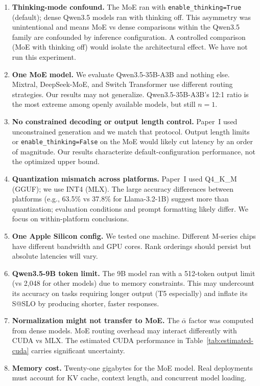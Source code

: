 \documentclass[11pt]{article}
\begin{document}
\begin{enumerate}[leftmargin=12pt]
    \item \textbf{Thinking-mode confound.} The MoE ran with \texttt{enable\_thinking=True} (default); dense Qwen3.5 models ran with thinking off.  This asymmetry was unintentional and means MoE vs dense comparisons within the Qwen3.5 family are confounded by inference configuration.  A controlled comparison (MoE with thinking off) would isolate the architectural effect.  We have not run this experiment.

    \item \textbf{One MoE model.} We evaluate Qwen3.5-35B-A3B and nothing else.  Mixtral, DeepSeek-MoE, and Switch Transformer use different routing strategies.  Our results may not generalize.  Qwen3.5-35B-A3B's 12:1 ratio is the most extreme among openly available models, but still $n = 1$.

    \item \textbf{No constrained decoding or output length control.} Paper~I used unconstrained generation and we match that protocol.  Output length limits or \texttt{enable\_thinking=False} on the MoE would likely cut latency by an order of magnitude.  Our results characterize default-configuration performance, not the optimized upper bound.

    \item \textbf{Quantization mismatch across platforms.} Paper~I used Q4\_K\_M (GGUF); we use INT4 (MLX).  The large accuracy differences between platforms (e.g., 63.5\% vs 37.8\% for Llama-3.2-1B) suggest more than quantization; evaluation conditions and prompt formatting likely differ.  We focus on within-platform conclusions.

    \item \textbf{One Apple Silicon config.} We tested one machine.  Different M-series chips have different bandwidth and GPU cores.  Rank orderings should persist but absolute latencies will vary.

    \item \textbf{Qwen3.5-9B token limit.} The 9B model ran with a 512-token output limit (vs 2,048 for other models) due to memory constraints.  This may undercount its accuracy on tasks requiring longer output (T5 especially) and inflate its S@SLO by producing shorter, faster responses.

    \item \textbf{Normalization might not transfer to MoE.} The $\bar{\alpha}$ factor was computed from dense models.  MoE routing overhead may interact differently with CUDA vs MLX.  The estimated CUDA performance in Table~\ref{tab:estimated-cuda} carries significant uncertainty.

    \item \textbf{Memory cost.} Twenty-one gigabytes for the MoE model.  Real deployments must account for KV cache, context length, and concurrent model loading.
\end{enumerate}
\end{document}
